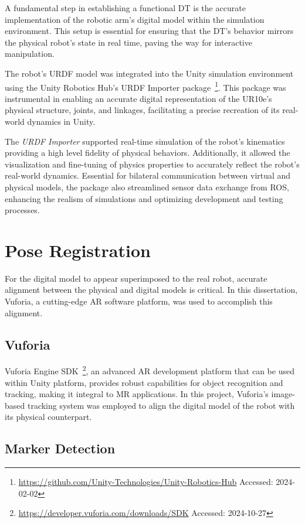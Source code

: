 A fundamental step in establishing a functional \ac{DT} is the accurate implementation of the robotic arm's digital model within the simulation environment. This setup is essential for ensuring that the \ac{DT}'s behavior mirrors the physical robot’s state in real time, paving the way for interactive manipulation.

The robot's \ac{URDF} model was integrated into the Unity simulation environment using the Unity Robotics Hub's \ac{URDF} Importer package~\footnote{\url{https://github.com/Unity-Technologies/Unity-Robotics-Hub} Accessed: 2024-02-02}. This package was instrumental in enabling an accurate digital representation of the UR10e’s physical structure, joints, and linkages, facilitating a precise recreation of its real-world dynamics in Unity.

The \textit{\ac{URDF} Importer} supported real-time simulation of the robot's kinematics providing a high level fidelity of physical behaviors. Additionally, it allowed the visualization and fine-tuning of physics properties to accurately reflect the robot's real-world dynamics. Essential for bilateral communication between virtual and physical models, the package also streamlined sensor data exchange from \ac{ROS}, enhancing the realism of simulations and optimizing development and testing processes.

\section{Pose Registration}
For the digital model to appear superimposed to the real robot, accurate alignment between the physical and digital models is critical. In this dissertation, Vuforia, a cutting-edge \ac{AR} software platform, was used to accomplish this alignment.

\subsection{Vuforia}
\label{section:marker-detection}

Vuforia Engine \ac{SDK}~\footnote{\url{https://developer.vuforia.com/downloads/SDK} Accessed: 2024-10-27}, an advanced \ac{AR} development platform that can be used within Unity platform, provides robust capabilities for object recognition and tracking, making it integral to \ac{MR} applications. In this project, Vuforia's image-based tracking system was employed to align the digital model of the robot with its physical counterpart.

\subsection{Marker Detection}


